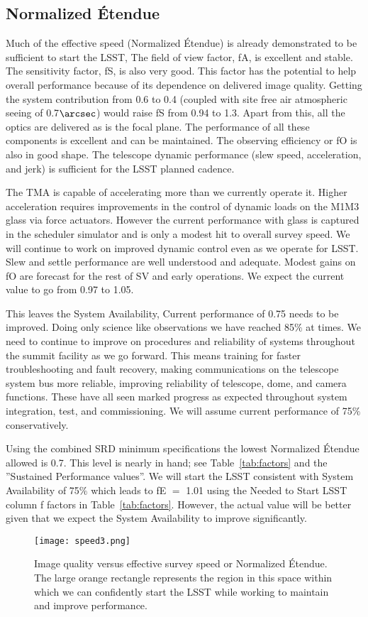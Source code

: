 \subsection{Normalized \'{E}tendue}
Much of the effective speed (Normalized  \'{E}tendue) is already demonstrated to be sufficient to start the LSST, The field of view factor, fA, is excellent and stable. The sensitivity factor, fS, is also very good. This factor has the potential to help overall performance because of its dependence on delivered image quality. Getting the system contribution from 0.6 to 0.4 (coupled with site free air atmospheric seeing of 0.7$\arcsec$) would raise fS from 0.94 to 1.3. Apart from this, all the optics are delivered as is the focal plane. The performance of all these components is excellent and can be maintained. The observing efficiency or fO is also in good shape. The telescope dynamic performance (slew speed, acceleration, and jerk) is sufficient for the LSST planned cadence. 

The TMA is capable of accelerating more than we currently operate it. Higher acceleration requires improvements in the control of dynamic loads on the M1M3 glass via force actuators. However the current performance with glass is captured in the scheduler simulator and is only a modest hit to overall survey speed. We will continue to work on improved dynamic control even as we operate for LSST. Slew and settle performance are well understood and adequate. Modest gains on fO are forecast for the rest of SV and early operations. We expect the current value to go from 0.97 to 1.05. 

This leaves the System Availability, Current performance of 0.75 needs to be improved. Doing only science like observations we have reached 85$\%$ at times. We need to continue to improve on procedures and reliability of systems throughout the summit facility as we go forward. This means training for faster troubleshooting and fault recovery, making communications on the telescope system bus more reliable, improving reliability of telescope, dome, and camera functions. These have all seen marked progress as expected throughout system integration, test, and commissioning. We will assume current performance of 75$\%$ conservatively. 

Using the combined SRD minimum specifications the lowest Normalized \'{E}tendue allowed is 0.7. This level is nearly in hand; see Table~\ref{tab:factors} and the ''Sustained Performance values''. We will start the LSST consistent with System Availability of 75$\%$ which leads to fE $=$ 1.01 using the Needed to Start LSST column f factors in Table~\ref{tab:factors}. However, the actual value will be better given that we expect the System Availability to improve significantly. 

\begin{figure}[t]
\centering
\texttt{[image: speed3.png]}
\caption{Image quality versus effective survey speed or Normalized \'{E}tendue. The large orange rectangle represents the region in this space within which we can confidently start the LSST while working to maintain and improve performance.}
\label{speed3}
\end{figure}

\newpage
